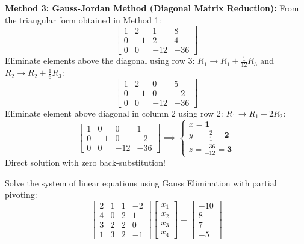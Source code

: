 \documentclass[11pt,a4paper]{article}
\begin{document}
\begin{solbox}
\textbf{Method 3: Gauss-Jordan Method (Diagonal Matrix Reduction):}
From the triangular form obtained in Method 1:
$$\left[\begin{array}{ccc|c}
1 & 2 & 1 & 8 \\
0 & -1 & 2 & 4 \\
0 & 0 & -12 & -36
\end{array}\right]$$
Eliminate elements above the diagonal using row 3:
$R_1 \to R_1 + \frac{1}{12}R_3$ and $R_2 \to R_2 + \frac{1}{6}R_3$:
$$\left[\begin{array}{ccc|c}
1 & 2 & 0 & 5 \\
0 & -1 & 0 & -2 \\
0 & 0 & -12 & -36
\end{array}\right]$$
Eliminate element above diagonal in column 2 using row 2: $R_1 \to R_1 + 2R_2$:
$$\left[\begin{array}{ccc|c}
1 & 0 & 0 & 1 \\
0 & -1 & 0 & -2 \\
0 & 0 & -12 & -36
\end{array}\right] \implies \begin{cases} x = \mathbf{1} \\ y = \frac{-2}{-1} = \mathbf{2} \\ z = \frac{-36}{-12} = \mathbf{3} \end{cases}$$
Direct solution with zero back-substitution!
\end{solbox}

\begin{exambox}
Solve the system of linear equations using Gauss Elimination with partial pivoting:
\begin{equation}
    \begin{bmatrix}
        2 & 1 & 1 & -2 \\
        4 & 0 & 2 & 1 \\
        3 & 2 & 2 & 0 \\
        1 & 3 & 2 & -1
    \end{bmatrix}
    \begin{bmatrix} x_1 \\ x_2 \\ x_3 \\ x_4 \end{bmatrix}
    =
    \begin{bmatrix} -10 \\ 8 \\ 7 \\ -5 \end{bmatrix}
\end{equation}
\end{exambox}
\end{document}
